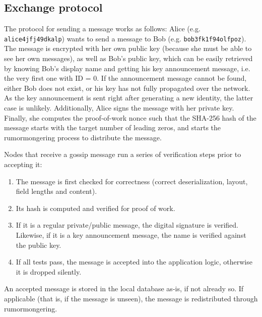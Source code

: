 \documentclass[a4paper,12pt]{article}
\begin{document}
\subsection*{Exchange protocol}
The protocol for sending a message works as follows: Alice (e.g. \texttt{alice4jfj49dkalp}) wants to send a message to Bob (e.g. \texttt{bob3fk1f94olfpoz}). The message is encrypted with her own public key (because she must be able to see her own messages), as well as Bob's public key, which can be easily retrieved by knowing Bob's display name and getting his key announcement message, i.e. the very first one with ID = 0. If the announcement message cannot be found, either Bob does not exist, or his key has not fully propagated over the network. As the key announcement is sent right after generating a new identity, the latter case is unlikely. Additionally, Alice signs the message with her private key. Finally, she computes the proof-of-work nonce such that the SHA-256 hash of the message starts with the target number of leading zeros, and starts the rumormongering process to distribute the message.

Nodes that receive a gossip message run a series of verification steps prior to accepting it:
\begin{enumerate}
\item The message is first checked for correctness (correct deserialization, layout, field lengths and content).
\item Its hash is computed and verified for proof of work.
\item If it is a regular private/public message, the digital signature is verified. Likewise, if it is a key announcement message, the name is verified against the public key.
\item If all tests pass, the message is accepted into the application logic, otherwise it is dropped silently.
\end{enumerate}

An accepted message is stored in the local database as-is, if not already so. If applicable (that is, if the message is unseen), the message is redistributed through rumormongering.
\end{document}
